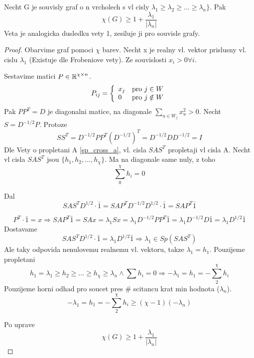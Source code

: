 \begin{theorem}
	Necht G je souvisly graf o n vrcholech s vl cisly $\lambda_1 \geq \lambda_2 \geq ... \geq \lambda_n \}$. Pak
	\[ \chi(G) \geq 1 + \frac{\lambda_1}{|\lambda_n|} \]
	Veta je analogicka dusledku vety 1, zesiluje ji pro souvisle grafy.
\end{theorem}
\begin{proof}
	Obarvime graf pomoci $\chi$ barev. Necht x je realny vl. vektor prislusny vl. cislu $\lambda_1$ (Existuje dle Frobeniove vety).
	Ze souvislosti $x_i > 0 \forall i$.

	Sestavime matici $P \in \operatorname{\mathbb{R}}^{\chi \times n}$.
	\[ P_{ij} = \left\{ \begin{array}{ll}  x_j & \mbox{pro } j \in W \\ 0 & \mbox{pro } j \notin W \end{array} \right. \]
	Pak $PP^T = D$ je diagonalni matice, na diagonale $\sum_{u \in W_j}x_u^2 > 0$.
	Necht $S = D^{-1/2}P$.
	Protoze
	\[SS^T = D^{-1/2}PP^T(D^{-1/2})^T = D^{-1/2}DD^{-1/2} = I\]
	Dle Vety o propletani A \cref{sp_cross_a}, vl. cisla $SAS^T$ propletaji vl cisla A.
	Necht vl cisla $SAS^T$ jsou $\{h_1, h_2,..., h_{\chi} \}$. Ma na diagonale same nuly, z toho %
	\[ \sum_0^{\chi} h_i = 0 \]

	Dal
	\[ SAS^{T}D^{1/2} \cdot \bar{1} = SAP^TD^{-1/2}D^{1/2} \cdot \bar{1} = SAP^T \bar{1} \]

	\[ P^T \cdot \bar{1} = x \Rightarrow SAP^T \bar{1} = SAx = \lambda_1 Sx = \lambda_1 D^{-1/2}PP^T \bar{1} = \lambda_1 D^{-1/2}D \bar{1} = \lambda_1 D^{1/2} \bar{1} \]
	Dostavame
	\[ SAS^TD^{1/2} \cdot \bar{1} = \lambda_1 D^{1/2} \bar{1} \Rightarrow \lambda_1 \in Sp(SAS^T) \]
	Ale taky odpovida nenulovemu realnemu vl. vektoru, takze $\lambda_1 = h_1$.
	Pouzijeme propletani
	\[ h_1 = \lambda_1 \geq h_2 \geq ... \geq h_{\chi} \geq \lambda_n \land \sum h_i = 0 \Rightarrow -\lambda_1 = h_1 = -\sum_2^{\chi} h_i \]
	Pouzijeme horni odhad pro soucet pres \# scitancu krat min hodnota ($\lambda_n$).
	\[ -\lambda_1 = h_1 = -\sum_2^{\chi} h_i \geq (\chi - 1)(-\lambda_n) \]

	Po uprave
	\[ \chi(G) \geq 1 + \frac{\lambda_1}{|\lambda_n|} \]
\end{proof}
